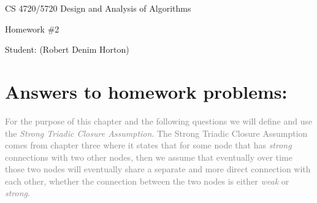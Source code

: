 \documentclass[11pt]{article}
\begin{document}
 

\rhead{\today}

\begin{center}\begin{Large}
CS 4720/5720 Design and Analysis of Algorithms

Homework \#2

Student: (Robert Denim Horton)
\end{Large}
\end{center}


\section*{Answers to homework problems:}
\textcolor{gray}{
For the purpose of this chapter and the following questions we will define and use the \textit{Strong Triadic Closure Assumption}.  The Strong Triadic Closure Assumption comes from chapter three where it states that for some node that has \textit{strong} connections with two other nodes, then  we assume that eventually over time those two nodes will eventually share a separate and more direct connection with each other, whether the connection between the two nodes is either \textit{weak} or \textit{strong}.\\\\
}
\end{document}
